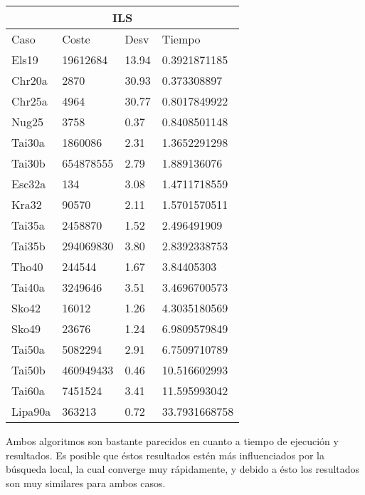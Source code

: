 \documentclass[twoside]{article}
\begin{document}
\begin{table}[h!]
\centering
    \begin{tabular}{llll}
    \hline
    \multicolumn{4}{c}{ILS} \\
    \toprule
    Caso               & Coste & Desv & Tiempo \\
    \midrule
    Els19&19612684&13.94&0.3921871185\\
    Chr20a&2870&30.93&0.373308897\\
    Chr25a&4964&30.77&0.8017849922\\
    Nug25&3758&0.37&0.8408501148\\
    Tai30a&1860086&2.31&1.3652291298\\
    Tai30b&654878555&2.79&1.889136076\\
    Esc32a&134&3.08&1.4711718559\\
    Kra32&90570&2.11&1.5701570511\\
    Tai35a&2458870&1.52&2.496491909\\
    Tai35b&294069830&3.80&2.8392338753\\
    Tho40&244544&1.67&3.84405303\\
    Tai40a&3249646&3.51&3.4696700573\\
    Sko42&16012&1.26&4.3035180569\\
    Sko49&23676&1.24&6.9809579849\\
    Tai50a&5082294&2.91&6.7509710789\\
    Tai50b&460949433&0.46&10.516602993\\
    Tai60a&7451524&3.41&11.595993042\\
    Lipa90a&363213&0.72&33.7931668758\\
    \bottomrule
    \end{tabular}
    \caption{}
\end{table}


Ambos algoritmos son bastante parecidos en cuanto a tiempo de ejecución
y resultados. Es posible que éstos resultados estén más influenciados
por la búsqueda local, la cual converge muy rápidamente, y debido a ésto
los resultados son muy similares para ambos casos.
\end{document}

